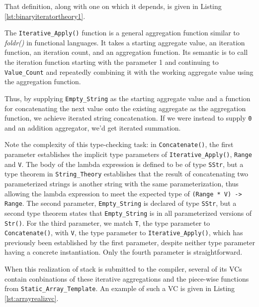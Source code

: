 That definition, along with one on which it depends, is given in Listing \ref{lst:binaryiteratortheory1}.



The \texttt{Iterative\_Apply()} function is a general aggregation function similar to \emph{foldr()} in functional languages.  It takes a starting aggregate value, an iteration function, an iteration count, and an aggregation function. Its semantic is to call the iteration function starting with the parameter 1 and continuing to \texttt{Value\_Count} and repeatedly combining it with the working aggregate value using the aggregation function.

Thus, by supplying \texttt{Empty\_String} as the starting aggregate value and a function for concatenating the next value onto the existing aggregate as the aggregation function, we achieve iterated string concatenation.  If we were instead to supply \texttt{0} and an addition aggregator, we'd get iterated summation.

Note the complexity of this type-checking task: in \texttt{Concatenate()}, the first parameter establishes the implicit type parameters of \texttt{Iterative\_Apply()}, \texttt{Range} and \texttt{V}.  The body of the lambda expression is defined to be of type \texttt{SStr}, but a type theorem in \texttt{String\_Theory} establishes that the result of concatenating two parameterized strings is another string with the same parameterization, thus allowing the lambda expression to meet the expected type of \texttt{(Range * V) -> Range}.  The second parameter, \texttt{Empty\_String} is declared of type \texttt{SStr}, but a second type theorem states that \texttt{Empty\_String} is in all parameterized versions of \texttt{Str()}.  For the third parameter, we match \texttt{T}, the type parameter to \texttt{Concatenate()}, with \texttt{V}, the type parameter to \texttt{Iterative\_Apply()}, which has previously been established by the first parameter, despite neither type parameter having a concrete instantiation.  Only the fourth parameter is straightforward.

When this realization of stack is submitted to the compiler, several of its VCs contain conbinations of these iterative aggregations and the piece-wise functions from \texttt{Static\_Array\_Template}.  An example of such a VC is given in Listing \ref{lst:arrayrealizvc}.


